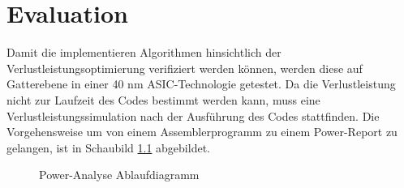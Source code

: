 \chapter{Evaluation}
\label{chap:evaluation} 
Damit die implementieren Algorithmen hinsichtlich der Verlustleistungsoptimierung verifiziert werden können, werden diese auf Gatterebene in einer 40 nm ASIC-Technologie getestet. Da die Verlustleistung nicht zur Laufzeit des Codes bestimmt werden kann, muss eine Verlustleistungssimulation nach der Ausführung des Codes stattfinden. Die Vorgehensweise um von einem Assemblerprogramm zu einem Power-Report zu gelangen, ist in Schaubild \ref{fig:flow_power_analyse} abgebildet.

\begin{scriptsize}
	\begin{figure}[htbp] 
		\centering
		
		\caption{Power-Analyse Ablaufdiagramm}
		\label{fig:flow_power_analyse}
	\end{figure}
\end{scriptsize}

